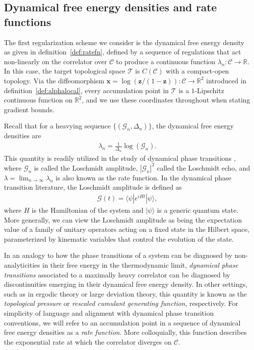 \documentclass[a4paper,11pt]{article}
\theoremstyle{plain}
\theoremstyle{definition}
\theoremstyle{remark}
\newcommand{\bs}[1]{\boldsymbol{#1}}
\newcommand{\ba}{\begin{equation} \begin{aligned}}
\newcommand{\ea}{\end{aligned} \end{equation}}
\newcommand{\De}{\Delta}
\begin{document}
\subsection{Dynamical free energy densities and rate functions}
\label{ratefunctions}

The first regularization scheme we consider is the dynamical free energy density as given in definition~\ref{def:ratefn}, defined by a sequence of regulations that act non-linearly on the correlator over $\mathscr{C}$ to produce a continuous function $\lambda_n: \mathscr{C} \to \mathbb{R}$. In this case, the target topological space $\mathcal{T}$ is $C(\mathscr{C})$ with a compact-open topology. Via the diffeomorphism $\bs{x} = \log(\bs{z}/(1-\bs{z})): \mathscr{C} \to \mathbb{R}^2$ introduced in definition~\ref{def:alphalocal}, every accumulation point in $\mathcal{T}$ is a $1$-Lipschitz continuous function on $\mathbb{R}^2$, and we use these coordinates throughout when stating gradient bounds. 

Recall that for a heavying sequence $\{(\mathcal{G}_n,\De_n)\}$, the dynamical free energy densities are
\ba
\lambda_n =  \frac{1}{ \Delta_n} \log\left(  \mathcal{G}_n \right).
\ea
This quantity is readily utilized in the study of dynamical phase transitions \cite{Heyl:2017blm}, where $\mathcal{G}_n$ is called the Loschmidt amplitude, $|\mathcal{G}_n|^2$ called the Loschmidt echo, and $\lambda = \lim_{n \to \infty} \lambda_n$ is also known as the rate function. In the dynamical phase transition literature, the Loschmidt amplitude is defined as 
\ba
\mathcal{G}(t)  = \langle \psi | e^{i H t} | \psi \rangle,
\ea
where $H$ is the Hamiltonian of the system and $|\psi\rangle$ is a generic quantum state. More generally, we can view the Loschmidt amplitude as being the expectation value of a family of unitary operators acting on a fixed state in the Hilbert space, parameterized by kinematic variables that control the evolution of the state. 

In an analogy to how the phase transitions of a system can be diagnosed by non-analyticities in their free energy in the thermodynamic limit, \textit{dynamical phase transitions} associated to a maximally heavy correlator can be diagnosed by discontinuities emerging in their dynamical free energy density. In other settings, such as in ergodic theory or large deviation theory, this quantity is known as the \textit{topological pressure} or \textit{rescaled cumulant generating function}, respectively. For simplicity of language and alignment with dynamical phase transition conventions, we will refer to an accumulation point in a sequence of dynamical free energy densities as a \textit{rate function}. More colloquially, this function describes the exponential rate at which the correlator diverges on $\mathscr{C}$.
\end{document}

